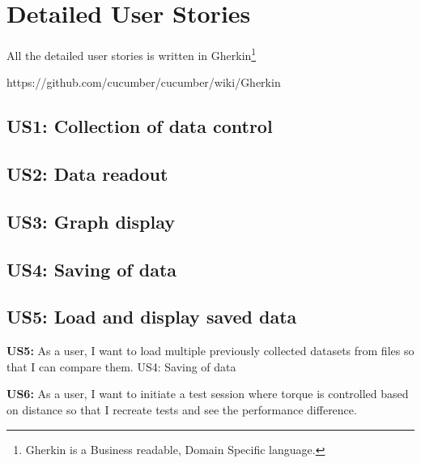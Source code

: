 \section{Detailed User Stories}

All the detailed user stories is written in Gherkin\footnote{Gherkin is a Business readable, Domain Specific language.}

https://github.com/cucumber/cucumber/wiki/Gherkin

\subsection{US1: Collection of data control}


\subsection{US2: Data readout}


\subsection{US3: Graph display}


\subsection{US4: Saving of data}


\subsection{US5: Load and display saved data}


\textbf{US5:} As a user, I want to load multiple previously collected datasets from files so that I can compare them.
US4: Saving of data

\textbf{US6:} As a user, I want to initiate a test session where torque is controlled based on distance so that I recreate tests and see the performance difference.